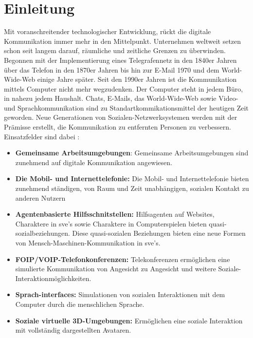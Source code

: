 \documentclass[a4paper,11pt]{article}%
\renewcommand{\\}{\vspace*{0.5\baselineskip} \newline}
\begin{document}
	
\section*{Einleitung}
	Mit voranschreitender technologischer Entwicklung, rückt die digitale Kommunikation immer mehr in den Mittelpunkt. Unternehmen weltweit setzen schon seit langem darauf, räumliche und zeitliche Grenzen zu überwinden. Begonnen mit der Implementierung eines Telegrafennetz in den 1840er Jahren über das Telefon in den 1870er Jahren bis hin zur E-Mail 1970 und dem World-Wide-Web einige Jahre später.
	Seit den 1990er Jahren ist die Kommunikation mittels Computer nicht mehr wegzudenken. Der Computer steht in jedem Büro, in nahezu jedem Haushalt. Chats, E-Mails, das World-Wide-Web sowie Video- und Sprachkommunikation sind zu Standartkommikationsmittel der heutigen Zeit geworden. \citep[p. 14-16]{thurlow2004computer} \\ 
Neue Generationen von Sozialen-Netzwerksystemen werden mit der Prämisse erstellt, die Kommunikation zu entfernten Personen zu verbessern.
Einsatzfelder sind dabei :
\begin{itemize}
	\item{\textbf{Gemeinsame Arbeitsumgebungen}: Gemeinsame Arbeitsumgebungen sind zunehmend auf digitale Kommunikation angewiesen.}
	\item{\textbf{Die Mobil- und Internettelefonie:} Die Mobil- und Internettelefonie bieten zunehmend ständigen, von Raum und Zeit unabhängigen, sozialen Kontakt zu anderen Nutzern}
	\item{\textbf{Agentenbasierte Hilfsschnitstellen:} Hilfsagenten auf Websites, Charaktere in \ac{sve}'s sowie Charaktere in Computerspielen bieten \dq{}quasi\dq{}-sozialbeziehungen. Diese \dq{}quasi\dq{}-sozialen Beziehungen bieten eine neue Formen von Mensch-Maschinen-Kommunikation in \ac{sve}'s.} 
	\item{\textbf{FOIP/VOIP-Telefonkonferenzen:} Telekonferenzen ermöglichen eine simulierte Kommunikation von Angesicht zu Angesicht und weitere Soziale-Interaktionmöglichkeiten.}
	\item{\textbf{Sprach-interfaces:} Simulationen von sozialen Interaktionen mit dem Computer durch die menschlichen Sprache.}
	\item{\textbf{Soziale virtuelle 3D-Umgebungen:} Ermöglichen eine soziale Interaktion mit vollständig dargestellten Avataren.}
\end{itemize}
\end{document}
